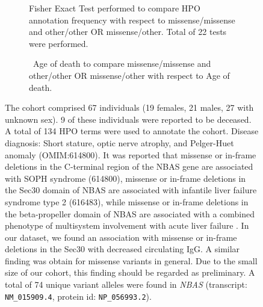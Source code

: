 \begin{figure}[htbp]
\begin{subfigure}[b]{0.95\textwidth}
\centering
{}
\captionsetup{justification=raggedright,singlelinecheck=false}
\caption{Fisher Exact Test performed to compare HPO annotation frequency with respect to missense/missense and other/other OR missense/other. Total of
22 tests were performed. }
\end{subfigure}
\vspace{2em}
\begin{subfigure}[b]{0.95\textwidth}
\captionsetup{justification=raggedright,singlelinecheck=false}
\caption{ Age of death to compare missense/missense and other/other OR missense/other with respect to Age of death. }
\end{subfigure}

\vspace{2em}

\caption{ The cohort comprised 67 individuals (19 females, 21 males, 27 with unknown sex). 9 of these individuals were reported to be deceased. A total of 134 HPO terms were used to annotate the cohort. Disease diagnosis: Short stature, optic nerve atrophy, and Pelger-Huet anomaly (OMIM:614800). It was reported that missense or in-frame deletions in the C-terminal region of the NBAS gene are associated with  SOPH syndrome (614800), 
missense or in-frame deletions in the Sec30 domain of NBAS are associated with infantile liver failure syndrome type 2 (616483), 
while missense or in-frame deletions in the beta-propeller domain of NBAS are associated with a combined phenotype of multisystem involvement with acute liver failure \cite{PMID_38244286}.
In our dataset, we found an association with  missense or in-frame deletions in the Sec30 with decreased circulating IgG. A similar finding was obtain for missense variants in general.
Due to the small size of our cohort, this finding should be regarded as preliminary.
 A total of 74 unique variant alleles were found in \textit{NBAS} (transcript: \texttt{NM\_015909.4}, protein id: \texttt{NP\_056993.2}).}
\end{figure}
